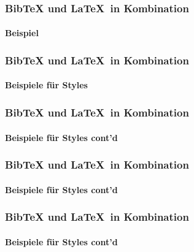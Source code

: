 

\begin{frame}
\frametitle{BibTeX und \LaTeX ~in Kombination}
\framesubtitle{Beispiel}




\end{frame}


\begin{frame}
\frametitle{BibTeX und \LaTeX ~in Kombination}
\framesubtitle{Beispiele für Styles}
\end{frame}


\begin{frame}
\frametitle{BibTeX und \LaTeX ~in Kombination}
\framesubtitle{Beispiele für Styles cont'd}
\end{frame}


\begin{frame}
\frametitle{BibTeX und \LaTeX ~in Kombination}
\framesubtitle{Beispiele für Styles cont'd}
\end{frame}


\begin{frame}
\frametitle{BibTeX und \LaTeX ~in Kombination}
\framesubtitle{Beispiele für Styles cont'd}
\end{frame}


